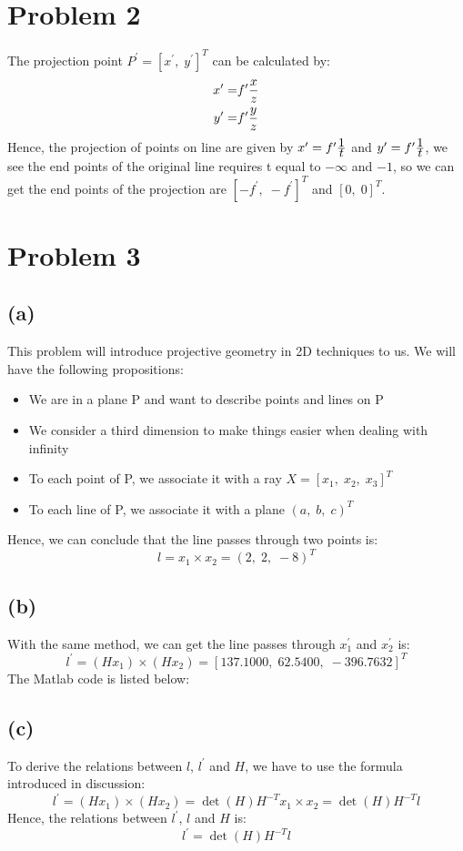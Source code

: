 \documentclass[letterpaper]{article}
\begin{document}
\hspace*{2em}
\section*{Problem 2}
The projection point $P^\prime = [x^\prime,\; y^\prime]^T$ can be calculated by:
\begin{align*}
	x^\prime = & f^\prime \frac{\displaystyle x}{\displaystyle z}\\
	y^\prime = & f^\prime \frac{\displaystyle y}{\displaystyle z}
\end{align*}
Hence, the projection of points on line are given by
$x^\prime = f^\prime \frac{\displaystyle 1}{\displaystyle t}$ and $y^\prime = f^\prime \frac{\displaystyle 1}{\displaystyle t}$, we see the end points of the original line requires t equal to $-\infty$ and $-1$, so we can get the end points of the projection are $[-f^\prime,\; -f^\prime]^T$ and $[0,\; 0]^T$.

\hspace*{2em}
\section*{Problem 3}
\subsection*{(a)}
This problem will introduce projective geometry in 2D techniques to us. We will have the following propositions:
\begin{itemize}
	\item We are in a plane P and want to describe points and lines on P
	\item We consider a third dimension to make things easier when dealing with infinity
	\item To each point of P, we associate it with a ray $X = [x_1,\; x_2,\; x_3]^T$
	\item To each line of P, we associate it with a plane $(a,\; b,\; c)^T$
\end{itemize}
Hence, we can conclude that the line passes through two points is:
$$l = x_1 \times x_2 = (2,\; 2,\; -8)^T$$
\subsection*{(b)}
With the same method, we can get the line passes through $x_1^\prime$ and $x_2^\prime$ is:
$$l^\prime = (Hx_1) \times (Hx_2) = [137.1000,\; 62.5400,\; -396.7632]^T$$
The Matlab code is listed below:

\subsection*{(c)}
To derive the relations between $l$, $l^\prime$ and $H$, we have to use the formula introduced in discussion:
$$l^\prime = (Hx_1) \times (Hx_2) = \det(H)H^{-T}x_1 \times x_2 = \det(H)H^{-T}l$$
Hence, the relations between $l^\prime$, $l$ and $H$ is:
$$l^\prime = \det(H)H^{-T}l$$
\end{document}
